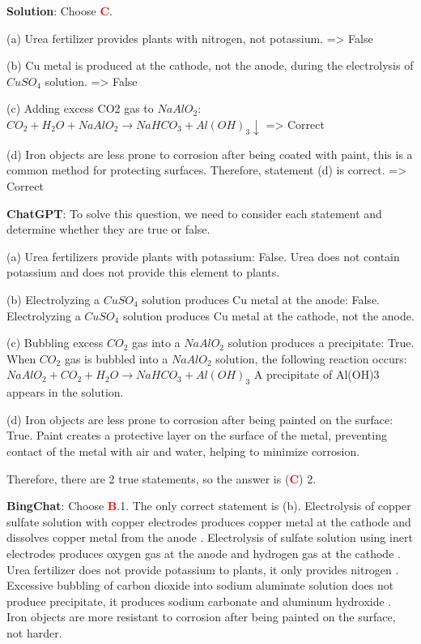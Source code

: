 \documentclass{article}
\begin{document}
{\begin{mdframed}[linewidth=1pt,linecolor=red]
		\begin{oneparchoices}
		\end{oneparchoices}
		
		\textbf{Solution}: Choose \textcolor{red}{\textbf{C}}.
		
		(a) Urea fertilizer provides plants with nitrogen, not potassium. => False
		
		(b) Cu metal is produced at the cathode, not the anode, during the electrolysis of $CuSO_4$ solution. => False
		
		(c) Adding excess CO2 gas to $NaAlO_2$: $CO_2 + H_2O + NaAlO_2 \rightarrow NaHCO_3 + Al(OH)_3\downarrow $ => Correct
		
		(d) Iron objects are less prone to corrosion after being coated with paint, this is a common method for protecting surfaces. Therefore, statement (d) is correct. => Correct
		
		\textbf{ChatGPT}: 
		To solve this question, we need to consider each statement and determine whether they are true or false.
		
		(a) Urea fertilizers provide plants with potassium: False. Urea does not contain potassium and does not provide this element to plants.
		
		(b) Electrolyzing a $CuSO_4$ solution produces Cu metal at the anode: False. Electrolyzing a $CuSO_4$ solution produces Cu metal at the cathode, not the anode.
		
		(c) Bubbling excess $CO_2$ gas into a $NaAlO_2$ solution produces a precipitate: True. When $CO_2$ gas is bubbled into a $NaAlO_2$ solution, the following reaction occurs:
		$ NaAlO_2 + CO_2 + H_2O \rightarrow NaHCO_3 + Al(OH)_3$
		A precipitate of Al(OH)3 appears in the solution.
		
		(d) Iron objects are less prone to corrosion after being painted on the surface: True. Paint creates a protective layer on the surface of the metal, preventing contact of the metal with air and water, helping to minimize corrosion.
		
		Therefore, there are 2 true statements, so the answer is (\textcolor{red}{\textbf{C}}) 2.
		
		
		
		\textbf{BingChat}: Choose \textcolor{red}{\textbf{B}}.1. The only correct statement is (b). Electrolysis of copper sulfate solution with copper electrodes produces copper metal at the cathode and dissolves copper metal from the anode . Electrolysis of sulfate solution using inert electrodes produces oxygen gas at the anode and hydrogen gas at the cathode . Urea fertilizer does not provide potassium to plants, it only provides nitrogen . Excessive bubbling of carbon dioxide into sodium aluminate solution does not produce precipitate, it produces sodium carbonate and aluminum hydroxide . Iron objects are more resistant to corrosion after being painted on the surface, not harder. 
		

\end{mdframed}}
\end{document}
